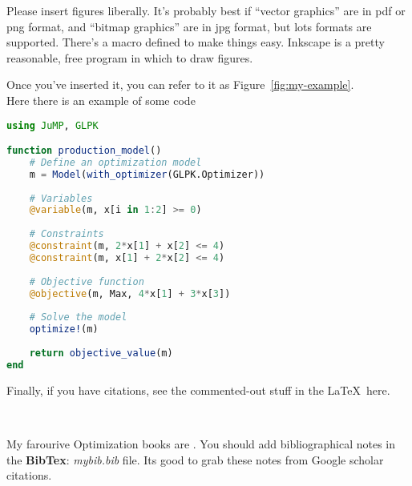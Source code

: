 \documentclass[12pt]{article}
\begin{document}
Please insert figures liberally.  It's probably best if ``vector graphics'' are in pdf or png format, and ``bitmap graphics'' are in jpg format, but lots formats are supported.  There's a macro defined to make things easy.  Inkscape is a pretty reasonable, free program in which to draw figures.
 

Once you've inserted it, you can refer to it as Figure~\ref{fig:my-example}.\\

Here there is an example of some code
\begin{lstlisting}[language=Julia]
using JuMP, GLPK

function production_model()
    # Define an optimization model
    m = Model(with_optimizer(GLPK.Optimizer))
    
    # Variables
    @variable(m, x[i in 1:2] >= 0)
    
    # Constraints
    @constraint(m, 2*x[1] + x[2] <= 4)
    @constraint(m, x[1] + 2*x[2] <= 4)
    
    # Objective function
    @objective(m, Max, 4*x[1] + 3*x[3])
    
    # Solve the model
    optimize!(m)
    
    return objective_value(m)
end
\end{lstlisting}
Finally, if you have citations, see the commented-out stuff in the \LaTeX~here.

\

My farourive Optimization books are \cite{bertsimas1997introduction} \cite{boyd2004convex} \cite{wolsey2014integer}. You should add bibliographical notes in the \textbf{BibTex}: \textit{mybib.bib} file. Its good to grab these notes from Google scholar citations.

%


\end{document}
